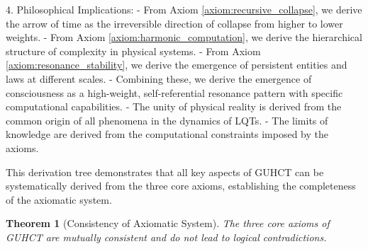 \documentclass[11pt,a4paper]{article}
\makeatletter
\newtheorem{theorem}{Theorem}[section]
\renewenvironment{proof}[1][\proofname]{\par
  \pushQED{\qed}%
  \normalfont \topsep6\p@\@plus6\p@\relax
  \trivlist
  \item[\hskip\labelsep
        \itshape
    #1\@addpunct{.}]\ignorespaces
}{%
  \popQED\endtrivlist\@endpefalse
}
\makeatother
\begin{document}
\begin{proof}
4. Philosophical Implications:
   - From Axiom \ref{axiom:recursive_collapse}, we derive the arrow of time as the irreversible direction of collapse from higher to lower weights.
   - From Axiom \ref{axiom:harmonic_computation}, we derive the hierarchical structure of complexity in physical systems.
   - From Axiom \ref{axiom:resonance_stability}, we derive the emergence of persistent entities and laws at different scales.
   - Combining these, we derive the emergence of consciousness as a high-weight, self-referential resonance pattern with specific computational capabilities.
   - The unity of physical reality is derived from the common origin of all phenomena in the dynamics of LQTs.
   - The limits of knowledge are derived from the computational constraints imposed by the axioms.

This derivation tree demonstrates that all key aspects of GUHCT can be systematically derived from the three core axioms, establishing the completeness of the axiomatic system.
\end{proof}

\begin{theorem}[Consistency of Axiomatic System]
\label{thm:axiom_consistency}
The three core axioms of GUHCT are mutually consistent and do not lead to logical contradictions.
\end{theorem}
\end{document}
